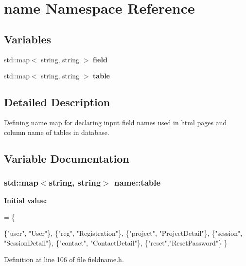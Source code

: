 \hypertarget{namespacename}{\section{name Namespace Reference}
\label{namespacename}
}
\subsection*{Variables}
\begin{DoxyCompactItemize}
\item 
\hypertarget{namespacename_ade348f92c1fe0d4168af8a49716bd048}{std\-::map$<$ string, string $>$ {\bfseries field}}\label{namespacename_ade348f92c1fe0d4168af8a49716bd048}

\item 
std\-::map$<$ string, string $>$ {\bfseries table}
\end{DoxyCompactItemize}


\subsection{Detailed Description}
Defining name map for declaring input field names used in html pages and column name of tables in database. 

\subsection{Variable Documentation}
\hypertarget{namespacename_a5fd14250e6493f4590c559c40a1428f8}{
\subsubsection[{table}]{\setlength{\rightskip}{0pt plus 5cm}std\-::map$<$string, string$>$ name\-::table}}\label{namespacename_a5fd14250e6493f4590c559c40a1428f8}
{\bfseries Initial value\-:}
\begin{DoxyCode}
= 
    \{

        

        \{\textcolor{stringliteral}{"user"}, \textcolor{stringliteral}{"User"}\},
        \{\textcolor{stringliteral}{"reg"}, \textcolor{stringliteral}{"Registration"}\},
        \{\textcolor{stringliteral}{"project"}, \textcolor{stringliteral}{"ProjectDetail"}\},
        \{\textcolor{stringliteral}{"session"}, \textcolor{stringliteral}{"SessionDetail"}\},
        \{\textcolor{stringliteral}{"contact"}, \textcolor{stringliteral}{"ContactDetail"}\},
        \{\textcolor{stringliteral}{"reset"},\textcolor{stringliteral}{"ResetPassword"}\}
    \}
\end{DoxyCode}


Definition at line 106 of file fieldname.\-h.


